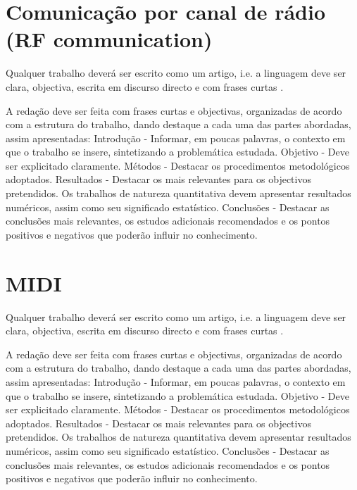 
\section{Comunicação por canal de rádio (RF communication)}
Qualquer trabalho deverá ser escrito como um artigo, i.e. a linguagem deve ser clara, objectiva, escrita em discurso directo e com frases curtas \cite{gustavii2016write, glasman2010science}.

A redação deve ser feita com frases curtas e objectivas, organizadas de acordo com a estrutura do trabalho, dando destaque a cada uma das partes abordadas, assim apresentadas: Introdução - Informar, em poucas palavras, o contexto em que o trabalho se insere, sintetizando a problemática estudada. Objetivo - Deve ser explicitado claramente. Métodos - Destacar os procedimentos metodológicos adoptados. Resultados - Destacar os mais relevantes para os objectivos pretendidos. Os trabalhos de natureza quantitativa devem apresentar resultados numéricos, assim como seu significado estatístico. Conclusões - Destacar as conclusões mais relevantes, os estudos adicionais recomendados e os pontos positivos e negativos que poderão influir no conhecimento.


\section{MIDI}
Qualquer trabalho deverá ser escrito como um artigo, i.e. a linguagem deve ser clara, objectiva, escrita em discurso directo e com frases curtas \cite{gustavii2016write, glasman2010science}.

A redação deve ser feita com frases curtas e objectivas, organizadas de acordo com a estrutura do trabalho, dando destaque a cada uma das partes abordadas, assim apresentadas: Introdução - Informar, em poucas palavras, o contexto em que o trabalho se insere, sintetizando a problemática estudada. Objetivo - Deve ser explicitado claramente. Métodos - Destacar os procedimentos metodológicos adoptados. Resultados - Destacar os mais relevantes para os objectivos pretendidos. Os trabalhos de natureza quantitativa devem apresentar resultados numéricos, assim como seu significado estatístico. Conclusões - Destacar as conclusões mais relevantes, os estudos adicionais recomendados e os pontos positivos e negativos que poderão influir no conhecimento.


